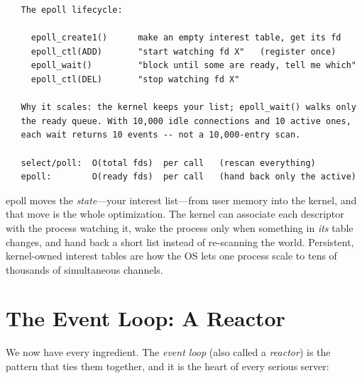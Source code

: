 \begin{verbatim}
   The epoll lifecycle:

     epoll_create1()      make an empty interest table, get its fd
     epoll_ctl(ADD)       "start watching fd X"   (register once)
     epoll_wait()         "block until some are ready, tell me which"
     epoll_ctl(DEL)       "stop watching fd X"

   Why it scales: the kernel keeps your list; epoll_wait() walks only
   the ready queue. With 10,000 idle connections and 10 active ones,
   each wait returns 10 events -- not a 10,000-entry scan.

   select/poll:  O(total fds)  per call   (rescan everything)
   epoll:        O(ready fds)  per call   (hand back only the active)
\end{verbatim}

\begin{osconcept}
epoll moves the \emph{state}---your interest list---from user memory
into the kernel, and that move is the whole optimization. The kernel
can associate each descriptor with the process watching it, wake the
process only when something in \emph{its} table changes, and hand back
a short list instead of re-scanning the world. Persistent, kernel-owned
interest tables are how the OS lets one process scale to tens of
thousands of simultaneous channels.
\end{osconcept}

\section{The Event Loop: A Reactor}

We now have every ingredient. The \emph{event loop} (also called a
\emph{reactor}) is the pattern that ties them together, and it is the
heart of every serious server:


